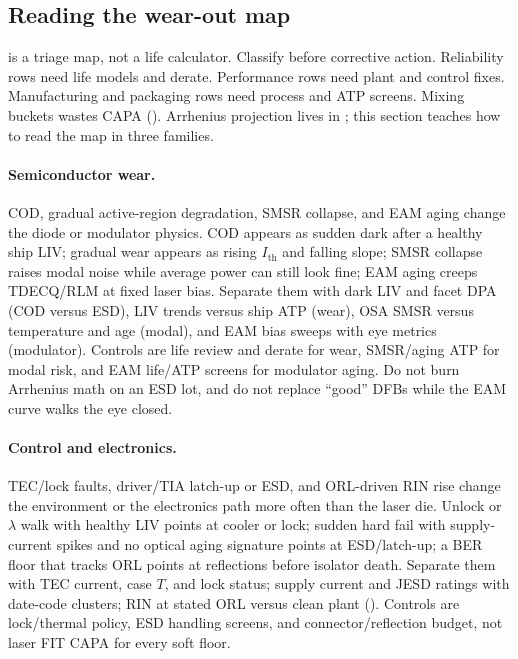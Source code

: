 \subsection{Reading the wear-out map}
\label{sec:wearout-map-read}

 is a triage map, not a life calculator. Classify before
corrective action. Reliability rows need life models and derate. Performance
rows need plant and control fixes. Manufacturing and packaging rows need process
and ATP screens. Mixing buckets wastes CAPA (). Arrhenius
projection lives in ; this section teaches how to read the
map in three families.

\paragraph{Semiconductor wear.}
COD, gradual active-region degradation, SMSR collapse, and EAM aging change the
diode or modulator physics. COD appears as sudden dark after a healthy ship LIV;
gradual wear appears as rising $I_\mathrm{th}$ and falling slope; SMSR collapse
raises modal noise while average power can still look fine; EAM aging creeps
TDECQ/RLM at fixed laser bias. Separate them with dark LIV and facet DPA (COD
versus ESD), LIV trends versus ship ATP (wear), OSA SMSR versus temperature and
age (modal), and EAM bias sweeps with eye metrics (modulator). Controls are life
review and derate for wear, SMSR/aging ATP for modal risk, and EAM life/ATP
screens for modulator aging. Do not burn Arrhenius math on an ESD lot, and do
not replace ``good'' DFBs while the EAM curve walks the eye closed.

\paragraph{Control and electronics.}
TEC/lock faults, driver/TIA latch-up or ESD, and ORL-driven RIN rise change the
environment or the electronics path more often than the laser die. Unlock or
$\lambda$ walk with healthy LIV points at cooler or lock; sudden hard fail with
supply-current spikes and no optical aging signature points at ESD/latch-up; a
BER floor that tracks ORL points at reflections before isolator death. Separate
them with TEC current, case $T$, and lock status; supply current and JESD
ratings with date-code clusters; RIN at stated ORL versus clean plant
(). Controls are
lock/thermal policy, ESD handling screens, and connector/reflection budget, not
laser FIT CAPA for every soft floor.

